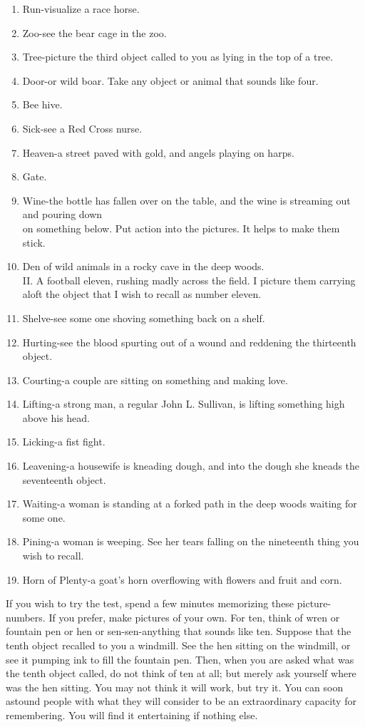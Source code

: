 \documentclass[10pt]{article}
\begin{document}
\begin{enumerate}
  \item Run-visualize a race horse.
  \item Zoo-see the bear cage in the zoo.
  \item Tree-picture the third object called to you as lying in the top of a tree.
  \item Door-or wild boar. Take any object or animal that sounds like four.
  \item Bee hive.
  \item Sick-see a Red Cross nurse.
  \item Heaven-a street paved with gold, and angels playing on harps.
  \item Gate.
  \item Wine-the bottle has fallen over on the table, and the wine is streaming out and pouring down\\
on something below. Put action into the pictures. It helps to make them stick.
  \item Den of wild animals in a rocky cave in the deep woods.\\
II. A football eleven, rushing madly across the field. I picture them carrying aloft the object that I wish to recall as number eleven.
  \item Shelve-see some one shoving something back on a shelf.
  \item Hurting-see the blood spurting out of a wound and reddening the thirteenth object.
  \item Courting-a couple are sitting on something and making love.
  \item Lifting-a strong man, a regular John L. Sullivan, is lifting something high above his head.
  \item Licking-a fist fight.
  \item Leavening-a housewife is kneading dough, and into the dough she kneads the seventeenth object.
  \item Waiting-a woman is standing at a forked path in the deep woods waiting for some one.
  \item Pining-a woman is weeping. See her tears falling on the nineteenth thing you wish to recall.
  \item Horn of Plenty-a goat's horn overflowing with flowers and fruit and corn.
\end{enumerate}

If you wish to try the test, spend a few minutes memorizing these picture-numbers. If you prefer, make pictures of your own. For ten, think of wren or fountain pen or hen or sen-sen-anything that sounds like ten. Suppose that the tenth object recalled to you a windmill. See the hen sitting on the windmill, or see it pumping ink to fill the fountain pen. Then, when you are asked what was the tenth object called, do not think of ten at all; but merely ask yourself where was the hen sitting. You may not think it will work, but try it. You can soon\\
astound people with what they will consider to be an extraordinary capacity for remembering. You will find it entertaining if nothing else.
\end{document}
